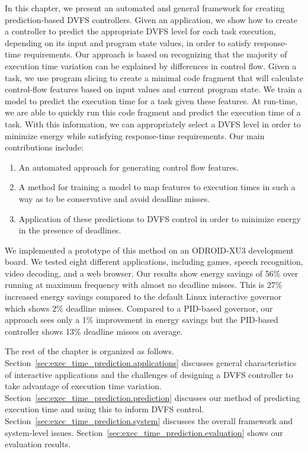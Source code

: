 In this chapter, we present an automated and general framework for creating
prediction-based DVFS controllers. Given an application, we show how to create
a controller to predict the appropriate DVFS level for each task execution,
depending on its input and program state values, in order to satisfy
response-time requirements. Our approach is based on recognizing that the
majority of execution time variation can be explained by differences in control
flow.  Given a task, we use program slicing to create a minimal code fragment
that will calculate control-flow features based on input values and current
program state. We train a model to predict the execution time for a task given
these features. At run-time, we are able to quickly run this code fragment and
predict the execution time of a task. With this information, we can
appropriately select a DVFS level in order to minimize energy while satisfying
response-time requirements.  Our main contributions include:
\begin{enumerate}
  \item An automated approach for generating control flow features.
  \item A method for training a model to map features to execution times in
  such a way as to be conservative and avoid deadline misses.
  \item Application of these predictions to DVFS control in order to minimize
  energy in the presence of deadlines.
\end{enumerate}

We implemented a prototype of this method on an ODROID-XU3 development board.
We tested eight different applications, including games, speech recognition,
video decoding, and a web browser. Our results show energy savings of 56\% over
running at maximum frequency with almost no deadline misses. This is 27\%
increased energy savings compared to the default Linux interactive governor
which shows 2\% deadline misses.  Compared to a PID-based governor, our
approach sees only a 1\% improvement in energy savings but the PID-based
controller shows 13\% deadline misses on average.

The rest of the chapter is organized as follows.
Section~\ref{sec:exec_time_prediction.applications} discusses general
characteristics of interactive applications and the challenges of designing a
DVFS controller to take advantage of execution time variation.
Section~\ref{sec:exec_time_prediction.prediction} discusses our method of
predicting execution time and using this to inform DVFS control.
Section~\ref{sec:exec_time_prediction.system} discusses the overall framework
and system-level issues. Section~\ref{sec:exec_time_prediction.evaluation}
shows our evaluation results. 
